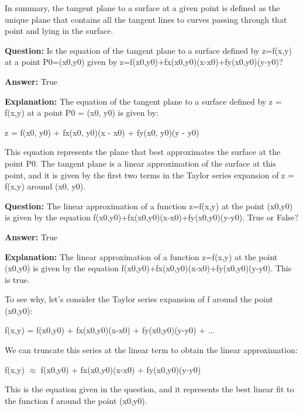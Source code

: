 \documentclass{article}
\begin{document}
In summary, the tangent plane to a surface at a given point is defined as the unique plane that contains all the tangent lines to curves passing through that point and lying in the surface.
                
                \vspace{0.5cm} 
        
            
                \textbf {Question:} Is the equation of the tangent plane to a surface defined by z=f(x,y) at a point P0=(x0,y0) given by z=f(x0,y0)+fx(x0,y0)(x-x0)+fy(x0,y0)(y-y0)?
                
                \textbf{Answer:} True

                \textbf{Explanation:} The equation of the tangent plane to a surface defined by z = f(x,y) at a point P0 = (x0, y0) is given by:

z = f(x0, y0) + fx(x0, y0)(x - x0) + fy(x0, y0)(y - y0)

This equation represents the plane that best approximates the surface at the point P0. The tangent plane is a linear approximation of the surface at this point, and it is given by the first two terms in the Taylor series expansion of z = f(x,y) around (x0, y0).
                
                \vspace{0.5cm} 
        
            
                \textbf {Question:} The linear approximation of a function z=f(x,y) at the point (x0,y0) is given by the equation f(x0,y0)+fx(x0,y0)(x-x0)+fy(x0,y0)(y-y0). True or False?
                
                \textbf{Answer:} True

                \textbf{Explanation:} The linear approximation of a function z=f(x,y) at the point (x0,y0) is given by the equation f(x0,y0)+fx(x0,y0)(x-x0)+fy(x0,y0)(y-y0). This is true.

To see why, let's consider the Taylor series expansion of f around the point (x0,y0):

f(x,y) = f(x0,y0) + fx(x0,y0)(x-x0) + fy(x0,y0)(y-y0) + ...

We can truncate this series at the linear term to obtain the linear approximation:

f(x,y) \ensuremath{\approx} f(x0,y0) + fx(x0,y0)(x-x0) + fy(x0,y0)(y-y0)

This is the equation given in the question, and it represents the best linear fit to the function f around the point (x0,y0).
                
\end{document}
